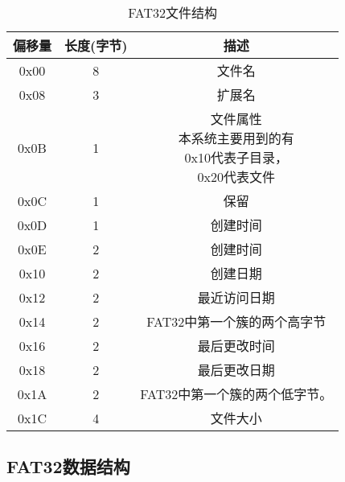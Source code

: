 \begin{table}[H]
  \centering
  \caption{FAT32文件结构}
  \begin{tabular}{|c|c|c|}
  \hline
  偏移量 & 长度(字节) & 描述                                                         \\
  \hline
  0x00   & 8          & 文件名                                                       \\
  \hline
  0x08   & 3          & 扩展名                                                       \\
  \hline
  0x0B   & 1          & \makecell{文件属性\\本系统主要用到的有\\0x10代表子目录，\\0x20代表文件} \\
  \hline
  0x0C   & 1          & 保留                                                         \\
  \hline
  0x0D   & 1          & 创建时间                                                     \\
  \hline
  0x0E   & 2          & 创建时间                                                     \\
  \hline
  0x10   & 2          & 创建日期                                                     \\
  \hline
  0x12   & 2          & 最近访问日期                                                 \\
  \hline
  0x14   & 2          & FAT32中第一个簇的两个高字节                                  \\
  \hline
  0x16   & 2          & 最后更改时间                                                 \\
  \hline
  0x18   & 2          & 最后更改日期                                                 \\
  \hline
  0x1A   & 2          & FAT32中第一个簇的两个低字节。                                \\
  \hline
  0x1C   & 4          & 文件大小                                                     \\
  \hline
  \end{tabular}
\end{table}




\subsection{FAT32数据结构}

